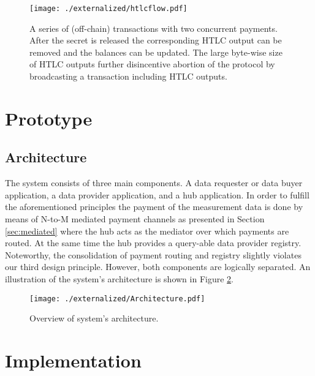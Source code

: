 \begin{figure}
\centering
\texttt{[image: ./externalized/htlcflow.pdf]}
\caption{A series of (off-chain) transactions with two concurrent payments. After the secret is released the corresponding HTLC output can be removed and the balances can be updated. The large byte-wise size of HTLC outputs further disincentive abortion of the protocol by broadcasting a transaction including HTLC outputs.}
\label{fig:htlcflow}
\end{figure}

\section{Prototype}

\subsection{Architecture}
The system consists of three main components. A data requester or data buyer application, a data provider application, and a hub application. In order to fulfill the aforementioned principles the payment of the measurement data is done by means of N-to-M mediated payment channels as presented in Section \ref{sec:mediated} where the hub acts as the mediator over which payments are routed. At the same time the hub provides a query-able data provider registry. Noteworthy, the consolidation of payment routing and registry slightly violates our third design principle. However, both components are logically separated. An illustration of the system's architecture is shown in Figure \ref{fig:architecture}.


 \begin{figure}
 \texttt{[image: ./externalized/Architecture.pdf]}
 \caption{Overview of system's architecture.}
 \label{fig:architecture}
 \end{figure}

\section{Implementation}
\label{sec:implementation}

